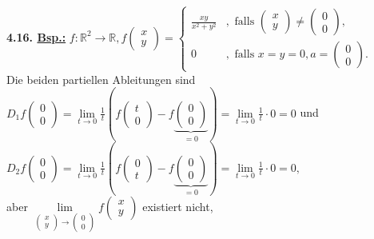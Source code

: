 \documentclass[]{scrartcl}
\begin{document}
\textbf{4.16. \underline{Bsp.:}} $f:\mathbb{R}^2\rightarrow\mathbb{R}, 
f\begin{pmatrix}
	x\\y
\end{pmatrix}=\begin{cases}
	\frac{xy}{x^2+y^2}&, \text{ falls } \begin{pmatrix}
		x\\y
	\end{pmatrix}\neq\begin{pmatrix}
	0\\0
\end{pmatrix},\\
0 &, \text{ falls } x=y=0, a=\begin{pmatrix}
	0\\0
\end{pmatrix}.
\end{cases}$\\
Die beiden partiellen Ableitungen sind $D_1f\begin{pmatrix}
	0\\0
\end{pmatrix}=\lim\limits_{t\rightarrow0}\frac{1}{t}(f\begin{pmatrix}
	t\\0
\end{pmatrix}-f\underbrace{\begin{pmatrix}
	0\\0
\end{pmatrix}}_{=0})=\lim\limits_{t\rightarrow 0}\frac{1}{t}\cdot0=0$ und 
$D_2f\begin{pmatrix}
	0\\0
\end{pmatrix}= \lim\limits_{t\rightarrow0}\frac{1}{t}(f\begin{pmatrix}
	0\\t
\end{pmatrix}-f\underbrace{\begin{pmatrix}
	0\\0
\end{pmatrix}}_{=0})=\lim\limits_{t\rightarrow 0}\frac{1}{t}\cdot0=0,$\\
aber $\lim\limits_{\begin{pmatrix}
	x\\y
\end{pmatrix}\rightarrow\begin{pmatrix}
	0\\0
\end{pmatrix}}f\begin{pmatrix}
	x\\y
\end{pmatrix}$ existiert nicht,\\
\end{document}
